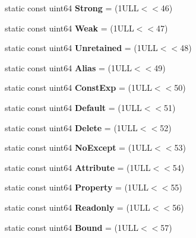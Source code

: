 \begin{DoxyCompactItemize}
static const uint64 {\bfseries Strong} = (1\+U\+L\+L$<$$<$46)
\item 
\mbox{\label{class_entry_ac4e4222ded00c776ad62dadac47d56e3}} 
static const uint64 {\bfseries Weak} = (1\+U\+L\+L$<$$<$47)
\item 
\mbox{\label{class_entry_a64b2b777cba602e308b811702be5ab58}} 
static const uint64 {\bfseries Unretained} = (1\+U\+L\+L$<$$<$48)
\item 
\mbox{\label{class_entry_a2b7df5462b391501de62d2f2238f0a75}} 
static const uint64 {\bfseries Alias} = (1\+U\+L\+L$<$$<$49)
\item 
\mbox{\label{class_entry_ada4aaba5fbbbf54141b2eb9eec393b17}} 
static const uint64 {\bfseries Const\+Exp} = (1\+U\+L\+L$<$$<$50)
\item 
\mbox{\label{class_entry_ad07a0f209289d0375b5740a58fdb3208}} 
static const uint64 {\bfseries Default} = (1\+U\+L\+L$<$$<$51)
\item 
\mbox{\label{class_entry_a7acc394a520d7dbc506a434baa11b2ff}} 
static const uint64 {\bfseries Delete} = (1\+U\+L\+L$<$$<$52)
\item 
\mbox{\label{class_entry_ac6b75896b4f2bda76dfc3c0a476af5c9}} 
static const uint64 {\bfseries No\+Except} = (1\+U\+L\+L$<$$<$53)
\item 
\mbox{\label{class_entry_a58fb43e4c3a836419285bdcc29302a80}} 
static const uint64 {\bfseries Attribute} = (1\+U\+L\+L$<$$<$54)
\item 
\mbox{\label{class_entry_a3f6eae37a5b311029176970ab0fdac14}} 
static const uint64 {\bfseries Property} = (1\+U\+L\+L$<$$<$55)
\item 
\mbox{\label{class_entry_a6560e43e64a7c5a4b579f6888c9f12f0}} 
static const uint64 {\bfseries Readonly} = (1\+U\+L\+L$<$$<$56)
\item 
\mbox{\label{class_entry_a34a5de5a4672f4fbcfd879dffc577f58}} 
static const uint64 {\bfseries Bound} = (1\+U\+L\+L$<$$<$57)

\end{DoxyCompactItemize}
